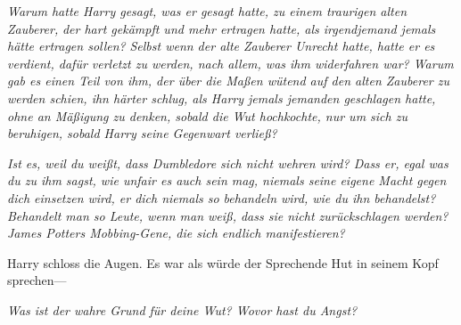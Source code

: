 \emph{Warum hatte Harry gesagt, was er gesagt hatte, zu einem traurigen alten Zauberer,} \emph{der hart gekämpft und mehr ertragen hatte, als irgendjemand jemals hätte ertragen sollen?} \emph{Selbst wenn der alte Zauberer Unrecht hatte, hatte er es verdient, dafür verletzt zu werden, nach allem, was ihm widerfahren war? Warum gab es einen Teil von ihm, der über die Maßen wütend auf den alten Zauberer zu werden schien, ihn härter schlug, als Harry jemals jemanden geschlagen hatte, ohne an Mäßigung zu denken, sobald die Wut hochkochte, nur um sich zu beruhigen, sobald Harry seine Gegenwart verließ?}

\emph{Ist es, weil du weißt, dass Dumbledore sich nicht wehren wird? Dass er, egal was du zu ihm sagst, wie unfair es auch sein mag, niemals seine eigene Macht gegen dich einsetzen wird, er dich niemals so behandeln wird, wie du ihn behandelst? Behandelt man so Leute, wenn man weiß, dass sie nicht zurückschlagen werden? James Potters Mobbing-Gene, die sich endlich manifestieren?}

Harry schloss die Augen.
%
Es war als würde der Sprechende Hut in seinem Kopf sprechen—


\emph{Was ist der wahre Grund für deine Wut? Wovor hast du Angst?}

